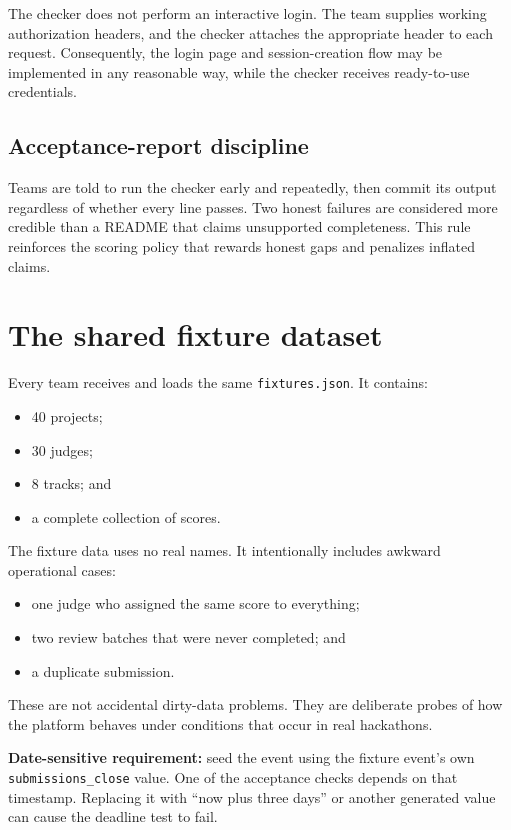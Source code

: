 \documentclass[11pt]{article}
\begin{document}
The checker does not perform an interactive login. The team supplies working authorization headers, and the checker attaches the appropriate header to each request. Consequently, the login page and session-creation flow may be implemented in any reasonable way, while the checker receives ready-to-use credentials.

\subsection{Acceptance-report discipline}

Teams are told to run the checker early and repeatedly, then commit its output regardless of whether every line passes. Two honest failures are considered more credible than a README that claims unsupported completeness. This rule reinforces the scoring policy that rewards honest gaps and penalizes inflated claims.

\section{The shared fixture dataset}

Every team receives and loads the same \texttt{fixtures.json}. It contains:

\begin{itemize}
  \item 40 projects;
  \item 30 judges;
  \item 8 tracks; and
  \item a complete collection of scores.
\end{itemize}

The fixture data uses no real names. It intentionally includes awkward operational cases:

\begin{itemize}
  \item one judge who assigned the same score to everything;
  \item two review batches that were never completed; and
  \item a duplicate submission.
\end{itemize}

These are not accidental dirty-data problems. They are deliberate probes of how the platform behaves under conditions that occur in real hackathons.

\begin{warningbox}
\textbf{Date-sensitive requirement:} seed the event using the fixture event's own \texttt{submissions\_close} value. One of the acceptance checks depends on that timestamp. Replacing it with ``now plus three days'' or another generated value can cause the deadline test to fail.
\end{warningbox}
\end{document}
